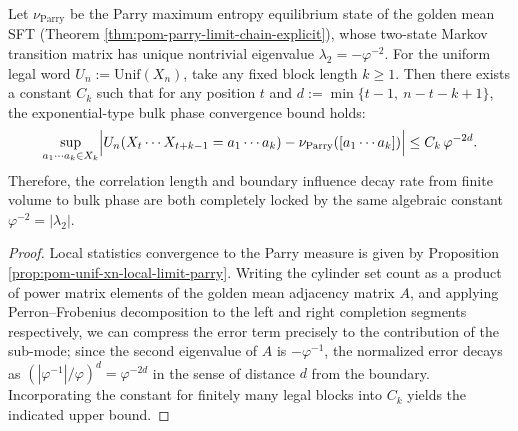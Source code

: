 \begin{conclusion}[Finite volume \texorpdfstring{$\Rightarrow$}{=>} Parry bulk phase at exponential rate: error locked solely by the second eigenvalue \texorpdfstring{$-\varphi^{-2}$}{-phi^{-2}}]\label{con:xi-terminal-unif-xn-to-parry-exp-rate}
Let \(\nu_{\mathrm{Parry}}\) be the Parry maximum entropy equilibrium state of the golden mean SFT (Theorem \ref{thm:pom-parry-limit-chain-explicit}), whose two-state Markov transition matrix has unique nontrivial eigenvalue \(\lambda_2=-\varphi^{-2}\).
For the uniform legal word \(U_n:=\mathrm{Unif}(X_n)\), take any fixed block length \(k\ge 1\).
Then there exists a constant \(C_k\) such that for any position \(t\) and
\(
d:=\min\{t-1,\ n-t-k+1\}
\),
the exponential-type bulk phase convergence bound holds:
\[
\sup_{a_1\cdots a_k\in X_k}\Bigl|
U_n(X_t\cdots X_{t+k-1}=a_1\cdots a_k)-\nu_{\mathrm{Parry}}([a_1\cdots a_k])
\Bigr|
\le C_k\,\varphi^{-2d}.
\]
Therefore, the correlation length and boundary influence decay rate from finite volume to bulk phase are both completely locked by the same algebraic constant \(\varphi^{-2}=|\lambda_2|\).
\end{conclusion}
\begin{proof}
Local statistics convergence to the Parry measure is given by Proposition \ref{prop:pom-unif-xn-local-limit-parry}.
Writing the cylinder set count as a product of power matrix elements of the golden mean adjacency matrix \(A\), and applying Perron--Frobenius decomposition to the left and right completion segments respectively, we can compress the error term precisely to the contribution of the sub-mode;
since the second eigenvalue of \(A\) is \(-\varphi^{-1}\), the normalized error decays as \((|\varphi^{-1}|/\varphi)^d=\varphi^{-2d}\) in the sense of distance \(d\) from the boundary.
Incorporating the constant for finitely many legal blocks into \(C_k\) yields the indicated upper bound.
\end{proof}

